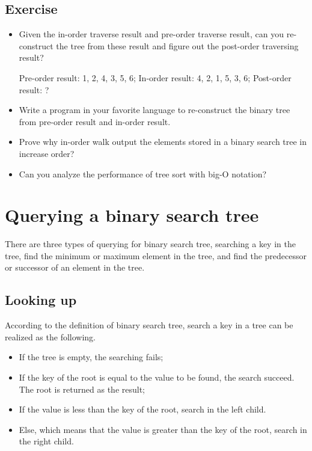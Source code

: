 \documentclass{article}
\begin{document}
\subsection*{Exercise}

\begin{itemize}
\item Given the in-order traverse result and pre-order traverse result, 
can you re-construct the tree from these result and figure out the 
post-order traversing result?

Pre-order result: 1, 2, 4, 3, 5, 6;
In-order result: 4, 2, 1, 5, 3, 6;
Post-order result: ?

\item Write a program in your favorite language to re-construct
the binary tree from pre-order result and in-order result.

\item Prove why in-order walk output the elements stored in a binary
search tree in increase order?

\item Can you analyze the performance of tree sort with big-O notation?
\end{itemize}

\section{Querying a binary search tree}

There are three types of querying for binary search tree, searching
a key in the tree, find the minimum or maximum element in the tree,
and find the predecessor or successor of an element in the tree.

\subsection{Looking up}
According to the definition of binary search tree, search
a key in a tree can be realized as the following.

\begin{itemize}
\item If the tree is empty, the searching fails;
\item If the key of the root is equal to the value to be found, the
search succeed. The root is returned as the result;
\item If the value is less than the key of the root, search in the left
child.
\item Else, which means that the value is greater than the key of the 
root, search in the right child.
\end{itemize}
\end{document}
